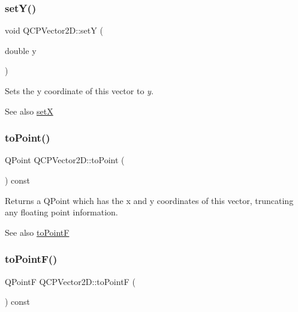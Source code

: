 \subsubsection{\texorpdfstring{set\+Y()}{setY()}}
{\footnotesize\ttfamily void Q\+C\+P\+Vector2\+D\+::setY (\begin{DoxyParamCaption}\item[{double}]{y }\end{DoxyParamCaption})\hspace{0.3cm}{\ttfamily [inline]}}

Sets the y coordinate of this vector to {\itshape y}.

\begin{DoxySeeAlso}{See also}
\hyperlink{class_q_c_p_vector2_d_ab4249e6ce7bfc37be56f014c54b761ae}{setX} 
\end{DoxySeeAlso}
\mbox{\label{class_q_c_p_vector2_d_add3edf75de9b7bf1abc693b973b2e906}} 
\subsubsection{\texorpdfstring{to\+Point()}{toPoint()}}
{\footnotesize\ttfamily Q\+Point Q\+C\+P\+Vector2\+D\+::to\+Point (\begin{DoxyParamCaption}{ }\end{DoxyParamCaption}) const\hspace{0.3cm}{\ttfamily [inline]}}

Returns a Q\+Point which has the x and y coordinates of this vector, truncating any floating point information.

\begin{DoxySeeAlso}{See also}
\hyperlink{class_q_c_p_vector2_d_acd7af3f4a62833ada58be3f3021dbbac}{to\+PointF} 
\end{DoxySeeAlso}
\mbox{\label{class_q_c_p_vector2_d_acd7af3f4a62833ada58be3f3021dbbac}} 
\subsubsection{\texorpdfstring{to\+Point\+F()}{toPointF()}}
{\footnotesize\ttfamily Q\+PointF Q\+C\+P\+Vector2\+D\+::to\+PointF (\begin{DoxyParamCaption}{ }\end{DoxyParamCaption}) const\hspace{0.3cm}{\ttfamily [inline]}}

